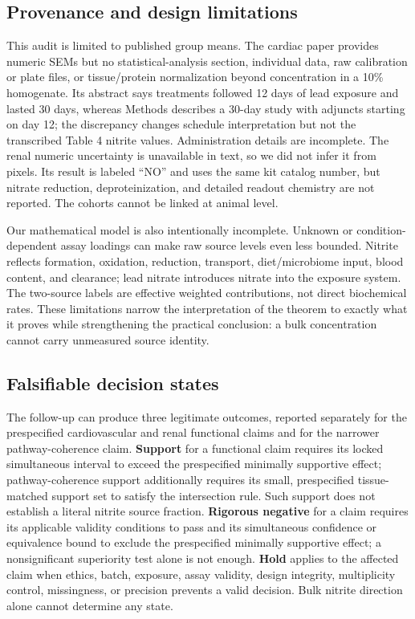 \documentclass[11pt]{article}
\begin{document}
\subsection{Provenance and design limitations}

This audit is limited to published group means. The cardiac paper provides numeric SEMs but no statistical-analysis section, individual data, raw calibration or plate files, or tissue/protein normalization beyond concentration in a 10\% homogenate. Its abstract says treatments followed 12 days of lead exposure and lasted 30 days, whereas Methods describes a 30-day study with adjuncts starting on day 12; the discrepancy changes schedule interpretation but not the transcribed Table 4 nitrite values. Administration details are incomplete. The renal numeric uncertainty is unavailable in text, so we did not infer it from pixels. Its result is labeled ``NO'' and uses the same kit catalog number, but nitrate reduction, deproteinization, and detailed readout chemistry are not reported. The cohorts cannot be linked at animal level.

Our mathematical model is also intentionally incomplete. Unknown or condition-dependent assay loadings can make raw source levels even less bounded. Nitrite reflects formation, oxidation, reduction, transport, diet/microbiome input, blood content, and clearance; lead nitrate introduces nitrate into the exposure system. The two-source labels are effective weighted contributions, not direct biochemical rates. These limitations narrow the interpretation of the theorem to exactly what it proves while strengthening the practical conclusion: a bulk concentration cannot carry unmeasured source identity.

\subsection{Falsifiable decision states}

The follow-up can produce three legitimate outcomes, reported separately for the prespecified cardiovascular and renal functional claims and for the narrower pathway-coherence claim. \textbf{Support} for a functional claim requires its locked simultaneous interval to exceed the prespecified minimally supportive effect; pathway-coherence support additionally requires its small, prespecified tissue-matched support set to satisfy the intersection rule. Such support does not establish a literal nitrite source fraction. \textbf{Rigorous negative} for a claim requires its applicable validity conditions to pass and its simultaneous confidence or equivalence bound to exclude the prespecified minimally supportive effect; a nonsignificant superiority test alone is not enough. \textbf{Hold} applies to the affected claim when ethics, batch, exposure, assay validity, design integrity, multiplicity control, missingness, or precision prevents a valid decision. Bulk nitrite direction alone cannot determine any state.
\end{document}
